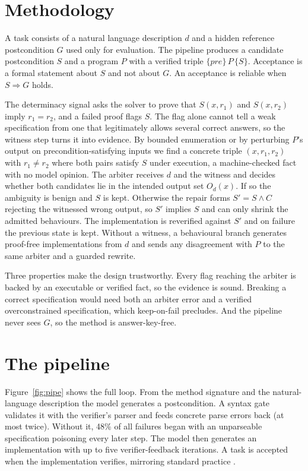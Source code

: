 \documentclass{esannV2}
\begin{document}
\section{Methodology}
\label{sec:method}

A task consists of a natural language description $d$ and a hidden reference
postcondition $G$ used only for evaluation. The pipeline produces a candidate
postcondition $S$ and a program $P$ with a verified triple
$\{\mathit{pre}\}\,P\,\{S\}$. Acceptance is a formal statement about $S$ and not
about $G$. An acceptance is reliable when $S \Rightarrow G$ holds.

The determinacy signal asks the solver to prove that $S(x,r_1)$ and $S(x,r_2)$
imply $r_1 = r_2$, and a failed proof flags $S$. The flag alone cannot tell a
weak specification from one that legitimately allows several correct answers, so
the witness step turns it into evidence. By bounded enumeration or by perturbing
$P$'s output on precondition-satisfying inputs we find a concrete triple
$(x, r_1, r_2)$ with $r_1 \neq r_2$ where both pairs satisfy $S$ under execution,
a machine-checked fact with no model opinion. The arbiter receives $d$ and the
witness and decides whether both candidates lie in the intended output set
$O_d(x)$. If so the ambiguity is benign and $S$ is kept. Otherwise the repair
forms $S' = S \wedge C$ rejecting the witnessed wrong output, so $S'$ implies $S$
and can only shrink the admitted behaviours. The implementation is reverified
against $S'$ and on failure the previous state is kept. Without a witness, a
behavioural branch generates proof-free implementations from $d$ and sends any
disagreement with $P$ to the same arbiter and a guarded rewrite.

Three properties make the design trustworthy. Every flag reaching the arbiter is
backed by an executable or verified fact, so the evidence is sound. Breaking a
correct specification would need both an arbiter error and a verified
overconstrained specification, which keep-on-fail precludes. And the pipeline
never sees $G$, so the method is answer-key-free.

\section{The pipeline}
\label{sec:setup}

Figure~\ref{fig:pipe} shows the full loop. From the method signature and the
natural-language description the model generates a postcondition. A syntax
gate validates it with the verifier's parser and feeds concrete parse errors back
(at most twice). Without it, 48\% of all failures began with an
unparseable specification poisoning every later step. The model then generates an
implementation with up to five verifier-feedback iterations. A task is
accepted when the implementation verifies, mirroring standard practice
\cite{vericoding,atlas}.
\end{document}
